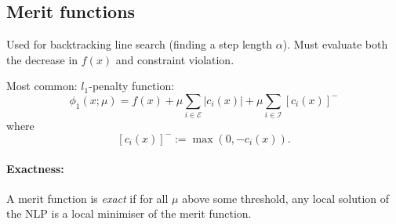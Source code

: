 \documentclass[a4paper, 12pt]{article}
\theoremstyle{definition}
\newcommand{\Econ}{\mathcal{E}}
\newcommand{\Icon}{\mathcal{I}}
\begin{document}
\subsection{Merit functions}
Used for backtracking line search (finding a step length \(\alpha\)). Must evaluate both the decrease in \(f(x)\) and constraint violation.

Most common: \(l_1\)-penalty function:
\begin{equation}
	\phi_1 (x; \mu) = f(x) + \mu \sum_{i \in \Econ} |c_i(x)| + \mu \sum_{i \in \Icon} \left[ c_i(x) \right]^-
\end{equation}
where
\begin{equation}
	\left[ c_i(x) \right]^- := \max(0, -c_i(x))
	.
\end{equation}

\paragraph{Exactness:} A merit function is \emph{exact} if for all \(\mu\) above some threshold, any local solution of the NLP is a local minimiser of the merit function.
\end{document}

